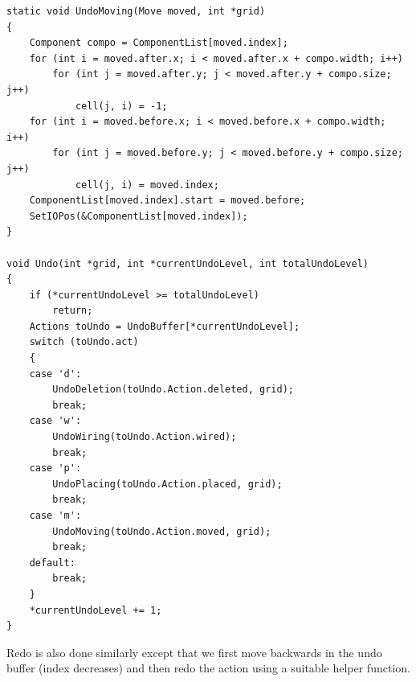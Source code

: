 \documentclass[report]{subfiles}
\begin{document}
\begin{lstlisting}
static void UndoMoving(Move moved, int *grid)
{
    Component compo = ComponentList[moved.index];
    for (int i = moved.after.x; i < moved.after.x + compo.width; i++)
        for (int j = moved.after.y; j < moved.after.y + compo.size; j++)
            cell(j, i) = -1;
    for (int i = moved.before.x; i < moved.before.x + compo.width; i++)
        for (int j = moved.before.y; j < moved.before.y + compo.size; j++)
            cell(j, i) = moved.index;
    ComponentList[moved.index].start = moved.before;
    SetIOPos(&ComponentList[moved.index]);
}

void Undo(int *grid, int *currentUndoLevel, int totalUndoLevel)
{
    if (*currentUndoLevel >= totalUndoLevel)
        return;
    Actions toUndo = UndoBuffer[*currentUndoLevel];
    switch (toUndo.act)
    {
    case 'd':
        UndoDeletion(toUndo.Action.deleted, grid);
        break;
    case 'w':
        UndoWiring(toUndo.Action.wired);
        break;
    case 'p':
        UndoPlacing(toUndo.Action.placed, grid);
        break;
    case 'm':
        UndoMoving(toUndo.Action.moved, grid);
        break;
    default:
        break;
    }
    *currentUndoLevel += 1;
}
\end{lstlisting}
Redo is also done similarly except that we first move backwards in the undo buffer (index decreases) and then redo the action using a suitable helper function.
\end{document}
